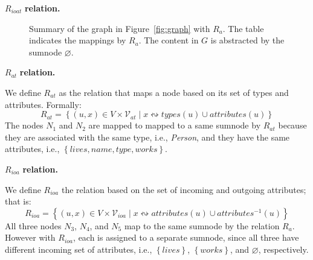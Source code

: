 \begin{labeling}{$R_{ioat}$ \textbf{relation.}}
\begin{figure}
	\centering
	\begin{minipage}{.75\textwidth}
		\resizebox{\textwidth}{!}{
			
		}
	\end{minipage}
	\quad
	\begin{minipage}[h]{.2\textwidth}
		\centering
		\caption*{$R_a\left(V, \mathcal{V}\right)$}
	\end{minipage}
	\caption{Summary of the graph in Figure~\ref{fig:graph} with $R_a$. The table indicates the mappings by $R_a$. The content in $G$ is abstracted by the sumnode $\varnothing$.}
	\label{fig:attributes-summary}
\end{figure}

\item[$R_{at}$ \textbf{relation.}]

We define $R_{at}$ as the relation that maps a node based on its set of types and attributes. Formally:
$$
R_{at} = \left\lbrace (u, x) \in V \times \mathcal{V}_{at} \mid x \leftrightsquigarrow types(u) \cup attributes(u) \right\rbrace
$$
The nodes $N_1$ and $N_2$ are mapped to mapped to a same sumnode by $R_{at}$ because they are associated with the same type, i.e., \emph{Person}, and they have the same attributes, i.e., $\left\lbrace lives, name, type, works \right\rbrace$.

\item[$R_{ioa}$ \textbf{relation.}]

We define $R_{ioa}$ the relation based on the set of incoming and outgoing attributes; that is:
\begin{equation*}
R_{ioa} = \left\lbrace (u, x) \in V \times \mathcal{V}_{ioa} \mid x \leftrightsquigarrow attributes(u) \cup attributes^{-1}(u) \right\rbrace
\end{equation*}
All three nodes $N_3$, $N_4$, and $N_5$ map to the same sumnode by the relation $R_a$. However with $R_{ioa}$, each is assigned to a separate sumnode, since all three have different incoming set of attributes, i.e., $\left\lbrace lives \right\rbrace$, $\left\lbrace works \right\rbrace$, and $\varnothing$, respectively.


\end{labeling}
